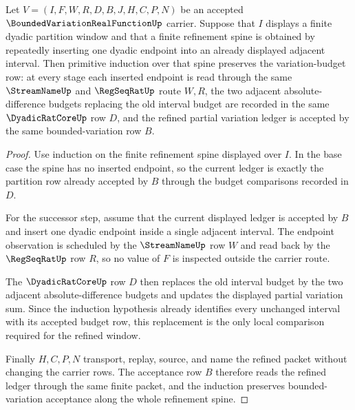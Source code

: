 \begin{theorem}
\label{thm:bounded-variation-partition-refinement-induction}
Let $V=(I,F,W,R,D,B,J,H,C,P,N)$ be an accepted $\BoundedVariationRealFunctionUp$ carrier. Suppose that $I$ displays a finite dyadic partition window and that a finite refinement spine is obtained by repeatedly inserting one dyadic endpoint into an already displayed adjacent interval. Then primitive induction over that spine preserves the variation-budget row: at every stage each inserted endpoint is read through the same $\StreamNameUp$ and $\RegSeqRatUp$ route $W,R$, the two adjacent absolute-difference budgets replacing the old interval budget are recorded in the same $\DyadicRatCoreUp$ row $D$, and the refined partial variation ledger is accepted by the same bounded-variation row $B$.
\end{theorem}
\begin{proof}
Use induction on the finite refinement spine displayed over $I$. In the base case the spine has no inserted endpoint, so the current ledger is exactly the partition row already accepted by $B$ through the budget comparisons recorded in $D$.

For the successor step, assume that the current displayed ledger is accepted by $B$ and insert one dyadic endpoint inside a single adjacent interval. The endpoint observation is scheduled by the $\StreamNameUp$ row $W$ and read back by the $\RegSeqRatUp$ row $R$, so no value of $F$ is inspected outside the carrier route.

The $\DyadicRatCoreUp$ row $D$ then replaces the old interval budget by the two adjacent absolute-difference budgets and updates the displayed partial variation sum. Since the induction hypothesis already identifies every unchanged interval with its accepted budget row, this replacement is the only local comparison required for the refined window.

Finally $H,C,P,N$ transport, replay, source, and name the refined packet without changing the carrier rows. The acceptance row $B$ therefore reads the refined ledger through the same finite packet, and the induction preserves bounded-variation acceptance along the whole refinement spine.
\end{proof}

